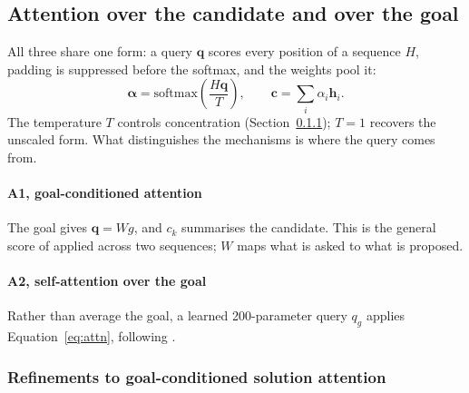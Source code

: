\documentclass[11pt]{article}
\begin{document}
\subsection{Attention over the candidate and over the goal}
\label{sec:attn}

All three share one form: a query $\mathbf{q}$ scores every position of a
sequence $H$, padding is suppressed before the softmax, and the weights pool
it:
\begin{equation}
\boldsymbol{\alpha} = \mathrm{softmax}\!\left(\frac{H\mathbf{q}}{T}\right),
\qquad
\mathbf{c} = \sum_i \alpha_i \mathbf{h}_i .
\label{eq:attn}
\end{equation}
The temperature $T$ controls concentration (Section~\ref{sec:refine}); $T = 1$
recovers the unscaled form. What distinguishes the mechanisms is where the
query comes from.

\paragraph{A1, goal-conditioned attention}
The goal gives $\mathbf{q}=Wg$, and $c_k$ summarises the candidate. This is
the general score of \citet{luong2015attention} applied across two sequences;
$W$ maps what is asked to what is proposed.

\paragraph{A2, self-attention over the goal}
Rather than average the goal, a learned 200-parameter query $q_g$ applies
Equation~\ref{eq:attn}, following \citet{yang2016hierarchical}.

\subsubsection{Refinements to goal-conditioned solution attention}
\label{sec:refine}
\end{document}
